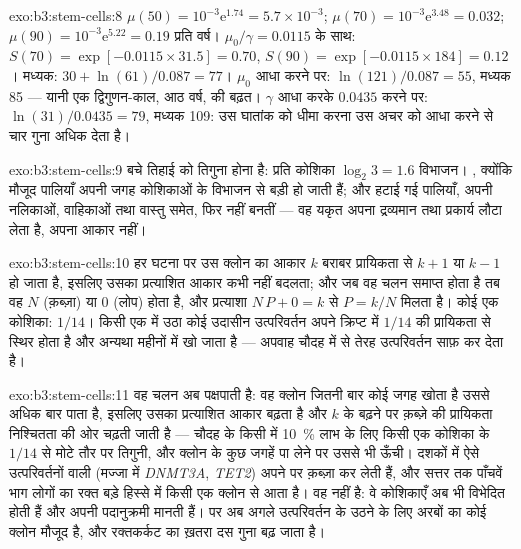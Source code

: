 \begin{solution}{exo:b3:stem-cells:8}
$\mu(50) = 10^{-3}\mathrm{e}^{1.74} = 5.7\times 10^{-3}$; $\mu(70) =
10^{-3}\mathrm{e}^{3.48} = 0.032$; $\mu(90) = 10^{-3}\mathrm{e}^{5.22} =
0.19$ प्रति वर्ष। $\mu_{0}/\gamma = 0.0115$ के साथ: $S(70) = \exp[-0.0115
\times 31.5] = 0.70$, $S(90) = \exp[-0.0115\times 184] = 0.12$। मध्यक:
$30 + \ln(61)/0.087 = 77$। $\mu_{0}$ आधा करने पर: $\ln(121)/0.087 = 55$,
मध्यक 85 --- यानी एक द्विगुणन-काल, आठ वर्ष, की बढ़त। $\gamma$ आधा करके
$0.0435$ करने पर: $\ln(31)/0.0435 = 79$, मध्यक 109: उस घातांक को धीमा
करना उस अचर को आधा करने से चार गुना अधिक देता है।
\end{solution}

\begin{solution}{exo:b3:stem-cells:9}
बचे तिहाई को तिगुना होना है: प्रति कोशिका $\log_{2}3 = 1.6$ विभाजन।
, क्योंकि मौजूद पालियाँ अपनी जगह कोशिकाओं के विभाजन से
बड़ी हो जाती हैं; और हटाई गई पालियाँ, अपनी नलिकाओं, वाहिकाओं तथा वास्तु
समेत, फिर नहीं बनतीं --- वह यकृत अपना द्रव्यमान तथा प्रकार्य लौटा लेता
है, अपना आकार नहीं।
\end{solution}

\begin{solution}{exo:b3:stem-cells:10}
हर घटना पर उस क्लोन का आकार $k$ बराबर प्रायिकता से $k + 1$ या $k - 1$
हो जाता है, इसलिए उसका प्रत्याशित आकार कभी नहीं बदलता; और जब वह चलन
समाप्त होता है तब वह $N$ (क़ब्ज़ा) या $0$ (लोप) होता है, और प्रत्याशा
$N\,P + 0 = k$ से $P = k/N$ मिलता है। कोई एक कोशिका: $1/14$। किसी एक  में उठा कोई उदासीन उत्परिवर्तन अपने क्रिप्ट में $1/14$ की
प्रायिकता से स्थिर होता है और अन्यथा महीनों में खो जाता है --- अपवाह
चौदह में से तेरह उत्परिवर्तन साफ़ कर देता है।
\end{solution}

\begin{solution}{exo:b3:stem-cells:11}
वह चलन अब पक्षपाती है: वह क्लोन जितनी बार कोई जगह खोता है उससे अधिक बार
पाता है, इसलिए उसका प्रत्याशित आकार बढ़ता है और $k$ के बढ़ने पर क़ब्ज़े
की प्रायिकता निश्चितता की ओर चढ़ती जाती है --- चौदह के किसी  में
\qty{10}{\%} लाभ के लिए किसी एक कोशिका के $1/14$ से मोटे तौर पर तिगुनी,
और क्लोन के कुछ जगहें पा लेने पर उससे भी ऊँची। दशकों में ऐसे
उत्परिवर्तनों वाली  (मज्जा में \emph{DNMT3A}, \emph{TET2})
अपने  पर क़ब्ज़ा कर लेती हैं, और सत्तर तक पाँचवें भाग लोगों का
रक्त बड़े हिस्से में किसी एक क्लोन से आता है। वह  नहीं है: वे
कोशिकाएँ अब भी विभेदित होती हैं और अपनी पदानुक्रमी मानती हैं। पर अब
अगले उत्परिवर्तन के उठने के लिए अरबों का कोई क्लोन मौजूद है, और
रक्तकर्कट का ख़तरा दस गुना बढ़ जाता है।
\end{solution}

